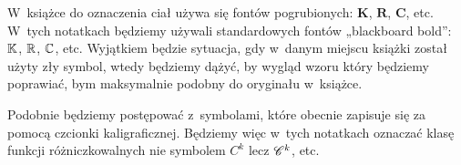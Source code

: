\documentclass[a4paper,11pt]{article}
\begin{document}













\newpage


\vspace{0em}



\vspace{0em}


W~książce do oznaczenia ciał używa się fontów pogrubionych:
$\mathbf{K}$, $\mathbf{R}$, $\mathbf{C}$, etc. W~tych notatkach będziemy
używali standardowych fontów „blackboard bold”: $\mathbb{K}$, $\mathbb{R}$, $\mathbb{C}$, etc.
Wyjątkiem będzie sytuacja, gdy w~danym miejscu książki został użyty zły
symbol, wtedy będziemy dążyć, by wygląd wzoru który będziemy poprawiać, bym
maksymalnie podobny do oryginału w~książce.

Podobnie będziemy postępować z~symbolami, które obecnie zapisuje się za
pomocą czcionki kaligraficznej. Będziemy więc w~tych notatkach oznaczać
klasę funkcji różniczkowalnych nie symbolem $C^{ k }$ lecz $\mathcal{C}^{ k }$,
etc.

\vspace{\spaceFour}
\end{document}
